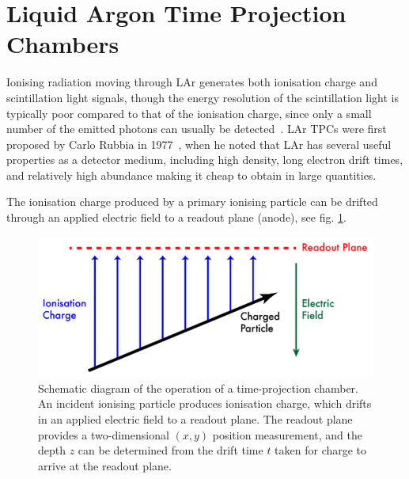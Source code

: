 \section{Liquid Argon Time Projection Chambers}
Ionising radiation moving through \ac{LAr} generates both ionisation charge and scintillation light signals, though the energy resolution of the scintillation light is typically poor compared to that of the ionisation charge, since only a small number of the emitted photons can usually be detected~\citep{Aprile2006}. \aclp{LAr TPC} were first proposed by Carlo Rubbia in 1977~\citep{Rubbia1977}, when he noted that \ac{LAr} has several useful properties as a detector medium, including high density, long electron drift times, and relatively high abundance making it cheap to obtain in large quantities.

The ionisation charge produced by a primary ionising particle can be drifted through an applied electric field to a readout plane (anode), see fig. \ref{fig:tpc-schematic}.

\begin{figure}
\centering
\includegraphics[width=\textwidth]{chapters/detectorphysics_images/TPC-Schematic}
\caption[Schematic diagram of the operation of a time-projection chamber]{\label{fig:tpc-schematic}Schematic diagram of the operation of a time-projection chamber. An incident ionising particle produces ionisation charge, which drifts in an applied electric field to a readout plane. The readout plane provides a two-dimensional $(x,y)$ position measurement, and the depth $z$ can be determined from the drift time $t$ taken for charge to arrive at the readout plane.}
\end{figure}

